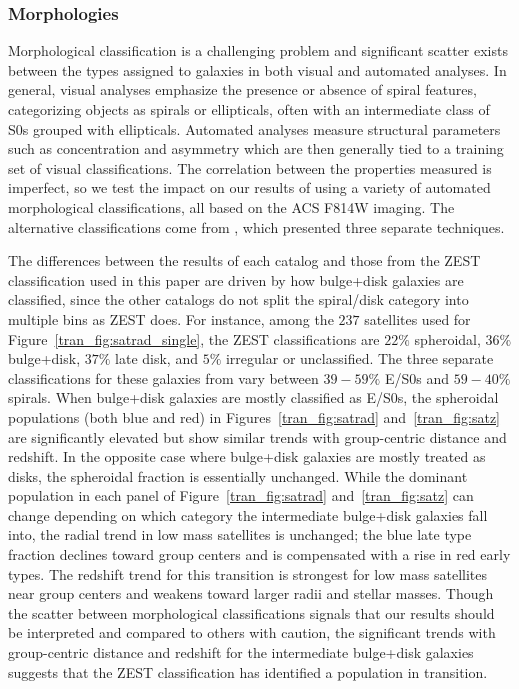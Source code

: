 \subsubsection{Morphologies}
\label{tran_s:sys_morph}

Morphological classification is a challenging problem and significant
scatter exists between the types assigned to galaxies in both visual
and automated analyses. In general, visual analyses emphasize the
presence or absence of spiral features, categorizing objects as
spirals or ellipticals, often with an intermediate class of S0s
grouped with ellipticals. Automated analyses measure structural
parameters such as concentration and asymmetry which are then
generally tied to a training set of visual classifications. The
correlation between the properties measured is imperfect, so we test
the impact on our results of using a variety of automated
morphological classifications, all based on the ACS F814W imaging. The
alternative classifications come from \citet{Tasca2009}, which
presented three separate techniques.

The differences between the results of each catalog and those from the
ZEST classification used in this paper are driven by how bulge+disk
galaxies are classified, since the other catalogs do not split the
spiral/disk category into multiple bins as ZEST does. For instance,
among the $237$ satellites used for Figure~\ref{tran_fig:satrad_single},
the ZEST classifications are $22\%$ spheroidal, $36\%$ bulge+disk,
$37\%$ late disk, and $5\%$ irregular or unclassified. The three separate
classifications for these galaxies from \citet{Tasca2009} vary between
$39 - 59\%$ E/S0s and $59 - 40\%$ spirals.
When bulge+disk galaxies are mostly classified as E/S0s, the
spheroidal populations (both blue and red) in Figures~\ref{tran_fig:satrad}
and~\ref{tran_fig:satz} are significantly elevated but show similar trends
with group-centric distance and redshift. In the opposite case where
bulge+disk galaxies are mostly treated as disks, the spheroidal
fraction is essentially unchanged. While the dominant population in
each panel of Figure~\ref{tran_fig:satrad} and~\ref{tran_fig:satz} can change
depending on which category the intermediate bulge+disk galaxies fall
into, the radial trend in low mass satellites is unchanged; the blue
late type fraction declines toward group centers and is compensated
with a rise in red early types. The redshift trend for this transition
is strongest for low mass satellites near group centers and weakens
toward larger radii and stellar masses. Though the scatter between
morphological classifications signals that our results should be
interpreted and compared to others with caution, the significant
trends with group-centric distance and redshift for the intermediate
bulge+disk galaxies suggests that the ZEST classification has
identified a population in transition.

